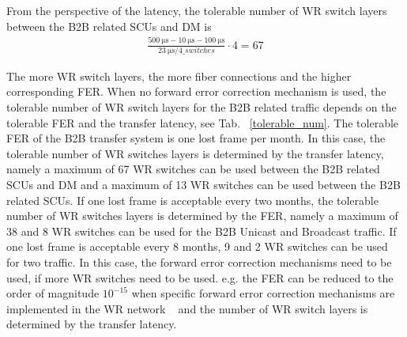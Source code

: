 From the perspective of the latency, the tolerable number of WR switch layers between the B2B related \gls{SCU}s and DM is
		\begin{equation}
		\begin{aligned}
			\frac{\SI{500}{\us}-\SI{10}{\us}-\SI{100}{\us}}{\SI{23}{\us/4\_switches}}\cdot 4=67
		\label {num_switch_b}
		\end{aligned}
		\end{equation}

The more WR switch layers, the more fiber connections and the higher corresponding FER. When no forward error correction mechanism is used, the tolerable number of WR switch layers for the B2B related traffic depends on the tolerable FER and the transfer latency, see Tab. ~\ref{tolerable_num}. The tolerable FER of the B2B transfer system is one lost frame per month. In this case, the tolerable number of WR switches layers is determined by the transfer latency, namely a maximum of 67 WR switches can be used between the B2B related SCUs and DM and a maximum of 13 WR switches can be used between the B2B related SCUs. If one lost frame is acceptable every two months, the tolerable number of WR switches layers is determined by the FER, namely a maximum of 38 and 8 WR switches can be used for the B2B Unicast and Broadcast traffic. If one lost frame is acceptable every 8 months, 9 and 2 WR switches can be used for two traffic. In this case, the forward error correction mechanisms need to be used, if more WR switches need to be used. e.g. the FER can be reduced to the order of magnitude $10^{-15}$ when specific forward error correction mechanisms are implemented in the WR network ~\cite{prados_white_2011} and the number of WR switch layers is determined by the transfer latency. 
